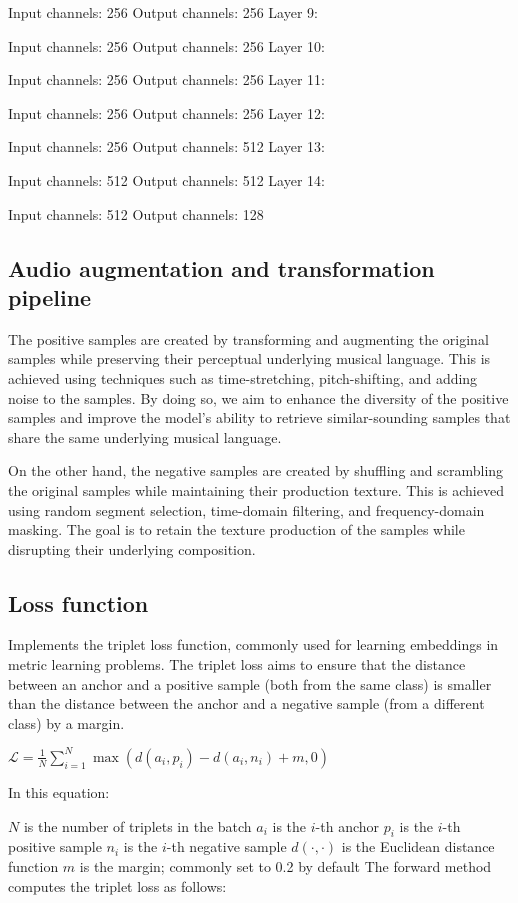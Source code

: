 Input channels: 256
Output channels: 256
Layer 9:

Input channels: 256
Output channels: 256
Layer 10:

Input channels: 256
Output channels: 256
Layer 11:

Input channels: 256
Output channels: 256
Layer 12:

Input channels: 256
Output channels: 512
Layer 13:

Input channels: 512
Output channels: 512
Layer 14:

Input channels: 512
Output channels: 128


\subsection{Audio augmentation and transformation pipeline}
The positive samples are created by transforming and augmenting the original samples while preserving their perceptual underlying musical language. This is achieved using techniques such as time-stretching, pitch-shifting, and adding noise to the samples. By doing so, we aim to enhance the diversity of the positive samples and improve the model's ability to retrieve similar-sounding samples that share the same underlying musical language.

On the other hand, the negative samples are created by shuffling and scrambling the original samples while maintaining their production texture. This is achieved using random segment selection, time-domain filtering, and frequency-domain masking. The goal is to retain the texture production of the samples while disrupting their underlying composition.

\subsection{Loss function}

Implements the triplet loss function, commonly used for learning embeddings in metric learning problems. The triplet loss aims to ensure that the distance between an anchor and a positive sample (both from the same class) is smaller than the distance between the anchor and a negative sample (from a different class) by a margin.

$\mathcal{L} = \frac{1}{N}\sum_{i=1}^{N} \max \left( d\left(a_i, p_i\right) - d\left(a_i, n_i\right) + m, 0 \right)$

In this equation:

$N$ is the number of triplets in the batch
$a_i$ is the $i$-th anchor
$p_i$ is the $i$-th positive sample
$n_i$ is the $i$-th negative sample
$d(\cdot, \cdot)$ is the Euclidean distance function
$m$ is the margin; commonly set to 0.2 by default
The forward method computes the triplet loss as follows:

